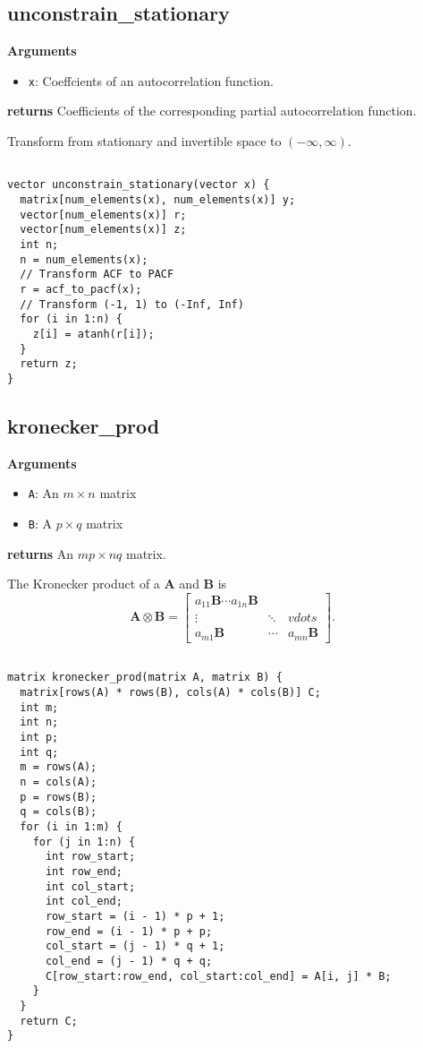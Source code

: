 \documentclass[]{book}
\providecommand{\tightlist}{%
  \setlength{\itemsep}{0pt}\setlength{\parskip}{0pt}}
\newcommand{\mat}[1]{\boldsymbol{#1}}
\begin{document}
\subsection{unconstrain\_stationary}\label{unconstrain_stationary}

\textbf{Arguments}

\begin{itemize}
\tightlist
\item
  \texttt{x}: Coeffcients of an autocorrelation function.
\end{itemize}

\textbf{returns} Coefficients of the corresponding partial
autocorrelation function.

Transform from stationary and invertible space to \((-\infty, \infty)\).

\begin{verbatim}

vector unconstrain_stationary(vector x) {
  matrix[num_elements(x), num_elements(x)] y;
  vector[num_elements(x)] r;
  vector[num_elements(x)] z;
  int n;
  n = num_elements(x);
  // Transform ACF to PACF
  r = acf_to_pacf(x);
  // Transform (-1, 1) to (-Inf, Inf)
  for (i in 1:n) {
    z[i] = atanh(r[i]);
  }
  return z;
}

\end{verbatim}

\subsection{kronecker\_prod}\label{kronecker_prod}

\textbf{Arguments}

\begin{itemize}
\tightlist
\item
  \texttt{A}: An \(m \times n\) matrix
\item
  \texttt{B}: A \(p \times q\) matrix
\end{itemize}

\textbf{returns} An \(mp \times nq\) matrix.

The Kronecker product of a \(\mat{A}\) and \(\mat{B}\) is \[
\mat{A} \otimes \mat{B} =
\begin{bmatrix}
a_{11} \mat{B} \cdots a_{1n} \mat{B} \\
\vdots & \ddots & vdots \\
a_{m1} \mat{B} & \cdots & a_{mn} \mat{B}
\end{bmatrix} .
\]

\begin{verbatim}

matrix kronecker_prod(matrix A, matrix B) {
  matrix[rows(A) * rows(B), cols(A) * cols(B)] C;
  int m;
  int n;
  int p;
  int q;
  m = rows(A);
  n = cols(A);
  p = rows(B);
  q = cols(B);
  for (i in 1:m) {
    for (j in 1:n) {
      int row_start;
      int row_end;
      int col_start;
      int col_end;
      row_start = (i - 1) * p + 1;
      row_end = (i - 1) * p + p;
      col_start = (j - 1) * q + 1;
      col_end = (j - 1) * q + q;
      C[row_start:row_end, col_start:col_end] = A[i, j] * B;
    }
  }
  return C;
}

\end{verbatim}
\end{document}
